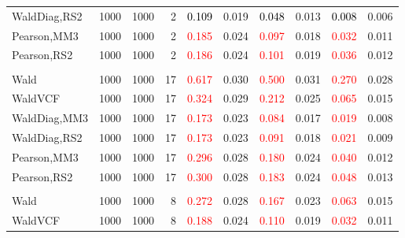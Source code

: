 \documentclass[
]{article}
\begin{document}
\begin{table}[H]
{\begin{tabular}[t]{lrrrrrrlrr}
\hspace{1em}WaldDiag,RS2 & 1000 & 1000 & 2 & \textcolor{black}{0.109} & 0.019 & \textcolor{black}{0.048} & 0.013 & \textcolor{black}{0.008} & 0.006\\
\hspace{1em}Pearson,MM3 & 1000 & 1000 & 2 & \textcolor{red}{0.185} & 0.024 & \textcolor{red}{0.097} & 0.018 & \textcolor{red}{0.032} & 0.011\\
\hspace{1em}Pearson,RS2 & 1000 & 1000 & 2 & \textcolor{red}{0.186} & 0.024 & \textcolor{red}{0.101} & 0.019 & \textcolor{red}{0.036} & 0.012\\
\addlinespace[0.3em]
\multicolumn{10}{l}{\textbf{1F 15V}}\\
\hspace{1em}Wald & 1000 & 1000 & 17 & \textcolor{red}{0.617} & 0.030 & \textcolor{red}{0.500} & 0.031 & \textcolor{red}{0.270} & 0.028\\
\hspace{1em}WaldVCF & 1000 & 1000 & 17 & \textcolor{red}{0.324} & 0.029 & \textcolor{red}{0.212} & 0.025 & \textcolor{red}{0.065} & 0.015\\
\hspace{1em}WaldDiag,MM3 & 1000 & 1000 & 17 & \textcolor{red}{0.173} & 0.023 & \textcolor{red}{0.084} & 0.017 & \textcolor{red}{0.019} & 0.008\\
\hspace{1em}WaldDiag,RS2 & 1000 & 1000 & 17 & \textcolor{red}{0.173} & 0.023 & \textcolor{red}{0.091} & 0.018 & \textcolor{red}{0.021} & 0.009\\
\hspace{1em}Pearson,MM3 & 1000 & 1000 & 17 & \textcolor{red}{0.296} & 0.028 & \textcolor{red}{0.180} & 0.024 & \textcolor{red}{0.040} & 0.012\\
\hspace{1em}Pearson,RS2 & 1000 & 1000 & 17 & \textcolor{red}{0.300} & 0.028 & \textcolor{red}{0.183} & 0.024 & \textcolor{red}{0.048} & 0.013\\
\addlinespace[0.3em]
\multicolumn{10}{l}{\textbf{2F 10V}}\\
\hspace{1em}Wald & 1000 & 1000 & 8 & \textcolor{red}{0.272} & 0.028 & \textcolor{red}{0.167} & 0.023 & \textcolor{red}{0.063} & 0.015\\
\hspace{1em}WaldVCF & 1000 & 1000 & 8 & \textcolor{red}{0.188} & 0.024 & \textcolor{red}{0.110} & 0.019 & \textcolor{red}{0.032} & 0.011\\

\end{tabular}}
\end{table}
\end{document}
